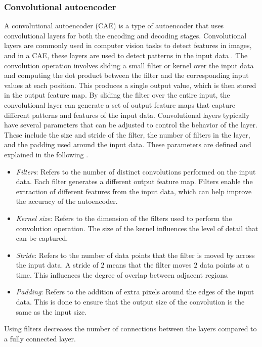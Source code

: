 \subsubsection{Convolutional autoencoder} \label{sec:convAutoencoder}
A convolutional autoencoder (CAE) is a type of autoencoder that uses convolutional layers for both the encoding and decoding stages. Convolutional layers are commonly used in computer vision tasks to detect features in images, and in a CAE, these layers are used to detect patterns in the input data \cite{geron2017hands,geng2016human,cheng2018deep}.
The convolution operation involves sliding a small filter or kernel over the input data and computing the dot product between the filter and the corresponding input values at each position. 
This produces a single output value, which is then stored in the output feature map. 
By sliding the filter over the entire input, the convolutional layer can generate a set of output feature maps that capture different patterns and features of the input data.
Convolutional layers typically have several parameters that can be adjusted to control the behavior of the layer. 
These include the size and stride of the filter, the number of filters in the layer, and the padding used around the input data.
These parameters are defined and explained in the following \cite{o2015introduction,albawi2017understanding}.
\begin{itemize}
	\item \textit{Filters}: Refers to the number of distinct convolutions performed on the input data. Each filter generates a different output feature map. Filters enable the extraction of different features from the input data, which can help improve the accuracy of the autoencoder.
	\item \textit{Kernel size}: Refers to the dimension of the filters used to perform the convolution operation. The size of the kernel influences the level of detail that can be captured.
	\item \textit{Stride}: Refers to the number of data points that the filter is moved by across the input data. A stride of $2$ means that the filter moves $2$ data points at a time. This influences the degree of overlap between adjacent regions.
	\item \textit{Padding}: Refers to the addition of extra pixels around the edges of the input data. This is done to ensure that the output size of the convolution is the same as the input size.
\end{itemize}
Using filters decreases the number of connections between the layers compared to a fully connected layer.
